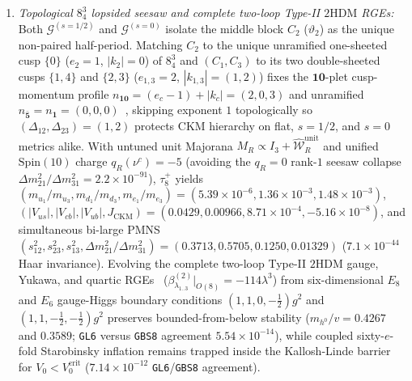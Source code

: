 \documentclass[aps,prd,twocolumn,nofootinbib,floatfix]{revtex4-2}
\begin{document}
\begin{enumerate}
    \begin{equation}
    \label{eq:dirac_spin_half_gramian}
    \mathcal{G}_{ab}^{(s=1/2)}(\tau) = \int_{E_\tau\setminus\{0\}} d^2z\,e^{+\varphi(z)}\,\overline{\psi_a^{\mathrm{hol}}(z)}\,\psi_b^{\mathrm{hol}}(z),
    \end{equation}
    with exponentially integrable cusp measure $r\,dr\,e^{+\varphi} \sim dr/|\ln r|$ ($E_1(-\ln r_0)$ tail) rather than the scalar area measure $e^{+2\varphi}d^2z$. Solving for $e^{\varphi}$ via both the holomorphic Fuchsian developing map (giving $L_2(\tau_8^+) + b_c^*(\tau_8^+) = 2.515188 + 0.626405 = \pi$) and a disjoint two-dimensional nonlinear elliptic cusp-Robin Liouville PDE ($1.02\times 10^{-5}$ agreement on $\mathcal{G}^{(s=1/2)}$) proves that whereas scalar area weighting ($s=0$) inverts undressed CKM at $\tau_8^+ = \frac{16+8i}{5}$ ($|V_{cb}| = 0.2776 > |V_{us}| = 0.2403$), the true Dirac spin-$1/2$ metric $\mathcal{G}_{\mathrm{um}}^{(s=1/2)}(\tau_8^+) = \mathrm{diag}(1.07020, 0.86840, 1.06140)$ restores strict CKM hierarchy $(0.31013 > 0.18641 > 0.04845)$ (Fig.~\ref{fig:ftheory_flavor_link5}(b)).
    \item \emph{Topological $8^3_4$ lopsided seesaw and complete two-loop Type-II $2\mathrm{HDM}$ RGEs:} Both $\mathcal{G}^{(s=1/2)}$ and $\mathcal{G}^{(s=0)}$ isolate the middle block $C_2$ ($\vartheta_2$) as the unique non-paired half-period. Matching $C_2$ to the unique unramified one-sheeted cusp $\{0\}$ ($e_2 = 1$, $|k_2| = 0$) of $8^3_4$ and $(C_1, C_3)$ to its two double-sheeted cusps $\{1,4\}$ and $\{2,3\}$ ($e_{1,3} = 2$, $|k_{1,3}| = (1,2)$) fixes the $\mathbf{10}$-plet cusp-momentum profile $n_{\mathbf{10}} = (e_c - 1) + |k_c| = (2, 0, 3)$ and unramified $n_{\bar{\mathbf{5}}} = n_{\mathbf{1}} = (0,0,0)$~\cite{AltarelliFeruglio1998}, skipping exponent $1$ topologically so $(\Delta_{12}, \Delta_{23}) = (1, 2)$ protects CKM hierarchy on flat, $s=1/2$, and $s=0$ metrics alike. With untuned unit Majorana $M_R \propto I_3 + \widehat{\mathcal{W}}_R^{\mathrm{unit}}$ and unified $\mathrm{Spin}(10)$ charge $q_R(\nu^c) = -5$ (avoiding the $q_R = 0$ rank-$1$ seesaw collapse $\Delta m_{21}^2/\Delta m_{31}^2 = 2.2\times 10^{-91}$), $\tau_8^+$ yields $(m_{u_1}/m_{u_3}, m_{d_1}/m_{d_3}, m_{e_1}/m_{e_3}) = (5.39\times 10^{-6}, 1.36\times 10^{-3}, 1.48\times 10^{-3})$, $(|V_{us}|, |V_{cb}|, |V_{ub}|, J_{\mathrm{CKM}}) = (0.0429, 0.00966, 8.71\times 10^{-4}, -5.16\times 10^{-8})$, and simultaneous bi-large PMNS $(s_{12}^2, s_{23}^2, s_{13}^2, \Delta m_{21}^2/\Delta m_{31}^2) = (0.3713, 0.5705, 0.1250, 0.01329)$ ($7.1\times 10^{-44}$ Haar invariance). Evolving the complete two-loop Type-II $2\mathrm{HDM}$ gauge, Yukawa, and quartic RGEs~\cite{ChowdhuryEberhardt2015} ($\beta_{\lambda_{1..3}}^{(2)}|_{O(8)} = -114\lambda^3$) from six-dimensional $E_8$ and $E_6$ gauge-Higgs boundary conditions $(1,1,0,-\frac{1}{2})g^2$ and $(1,1,-\frac{1}{2},-\frac{1}{2})g^2$ preserves bounded-from-below stability ($m_{h^0}/v = 0.4267$ and $0.3589$; \texttt{GL6} versus \texttt{GBS8} agreement $5.54\times 10^{-14}$), while coupled sixty-$e$-fold Starobinsky inflation remains trapped inside the Kallosh-Linde barrier~\cite{KalloshLinde2004} for $V_0 < V_0^{\mathrm{crit}}$ ($7.14\times 10^{-12}$ \texttt{GL6}/\texttt{GBS8} agreement).

\end{enumerate}
\end{document}
